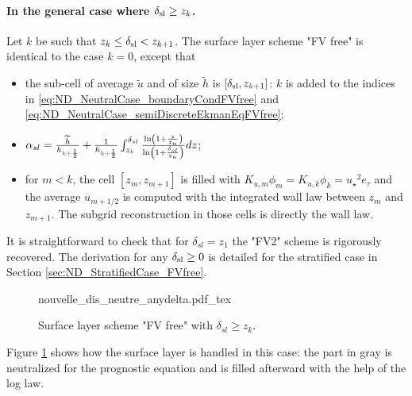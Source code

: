 \paragraph{In the general case where $\delta_{\rm sl} \geq z_k$.}
Let $k$ be such that $z_k \leq \delta_{\rm sl} < z_{k+1}$.
The surface layer scheme "FV free" is identical to the case $k=0$, except that
\begin{itemize}
	\item the sub-cell of average $\widetilde{u}$ and of size
		$\widetilde{h}$ is $[\delta_{\rm sl}, z_{\emphase{k+}1}]$:
		$k$ is added to the indices in 
		\eqref{eq:ND_NeutralCase_boundaryCondFVfree} and
		\eqref{eq:ND_NeutralCase_semiDiscreteEkmanEqFVfree};
	\item $\alpha_{sl} = \frac{\widetilde{h}}
			{h_{\emphase{k+}\frac{1}{2}}} +
		\frac{1}{h_{\emphase{k+}\frac{1}{2}}}
		\int_{z_\emphase{k}}^{\delta_{sl}}
		\frac{\ln(1+\frac{z}{z_{u}})}
			{\ln(1+\frac{\delta_{sl}}{z_{u}})} dz$;
	\item for $m < k$, the cell $[z_m, z_{m+1}]$ is filled with
		$K_{u,m} \phi_m = K_{u,k}\phi_k =
	{u_\star}^2e_\tau$
		and the average $\overline{u}_{m+1/2}$
		is computed with the integrated wall law
		between $z_m$ and $z_{m+1}$.
		The subgrid reconstruction in those cells is directly
		the wall law.
\end{itemize}
It is straightforward to check that for $\delta_{sl} = z_1$
the "FV2" scheme is rigorously recovered.
The derivation for any $\delta_{\rm sl} \geq 0$ is detailed for
the stratified case in Section \ref{sec:ND_StratifiedCase_FVfree}.
\begin{figure}
	{nouvelle_dis_neutre_anydelta.pdf_tex}
	\caption{ Surface layer scheme "FV free" with
	$\delta_{sl} \geq z_k$.}
	\label{fig:ND_NeutralCase_nouvelle_dis_neutre_anydelta}
\end{figure}
Figure \ref{fig:ND_NeutralCase_nouvelle_dis_neutre_anydelta}
shows how the surface layer is handled in this case: the part in gray
is neutralized for the prognostic equation and is filled afterward
with the help of the log law.
